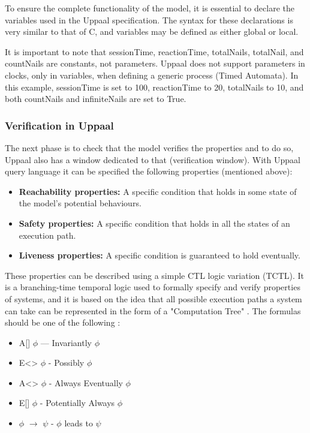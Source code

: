 To ensure the complete functionality of the model, it is essential to declare the variables used in the Uppaal specification. The syntax for these declarations is very similar to that of C, and variables may be defined as either global or local.

It is important to note that sessionTime, reactionTime, totalNails, totalNail, and countNails are constants, not parameters. Uppaal does not support parameters in clocks, only in variables, when defining a generic process (Timed Automata). In this example, sessionTime is set to 100, reactionTime to 20, totalNails to 10, and both countNails and infiniteNails are set to True.


\subsubsection*{Verification in Uppaal}

The next phase is to check that the model verifies the properties and to do so, Uppaal also has a window dedicated to that (verification window). With Uppaal query language it can be specified the following properties (mentioned above):

\begin{itemize}
    \item \textbf{Reachability properties:} A specific condition that holds in some state of the model’s potential behaviours.

    \item \textbf{Safety properties:} A specific condition that holds in all the states of an execution path.

    \item \textbf{Liveness properties:} A specific condition is guaranteed to hold eventually.

\end{itemize}

These properties can be described using a simple CTL logic variation (TCTL)\cite{lee2009timed}. It is a branching-time temporal logic used to formally specify and verify properties of systems, and it is based on the idea that all possible execution paths a system can take can be represented in the form of a "Computation Tree" \cite{lee2009timed}. The formulas should be one of the following \cite{bengtsson2004timed}:

\begin{itemize}
    \item A[] $\phi$ — Invariantly $\phi$

    \item E<> $\phi$ - Possibly $\phi$

    \item A<> $\phi$ - Always Eventually $\phi$

    \item E[] $\phi$ - Potentially Always $\phi$

    \item $\phi$ $\longrightarrow$ $\psi$ - $\phi$ leads to $\psi$
    
\end{itemize}

